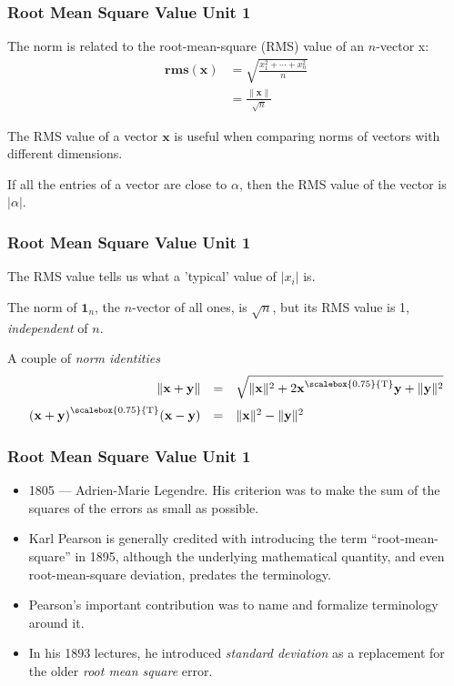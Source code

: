 \documentclass[12pt]{beamer}
\newcommand{\FrameTitle}[2]{\frametitle{#1 \hfill \small\textnormal{\textcolor{midgray}{#2}}}}
\newcommand{\vsp}{\vspace*{1em}}
\newcommand{\MVec}[1]{\mathbf{#1}}
\newcommand{\Norm}[1]{\lVert {\mathbf{#1}} \rVert}
\newcommand{\Trans}{\text{\raisebox{0.5ex}{\scalebox{0.75}{T}}}}
\newcommand{\abs}[1]{\lvert {#1} \rvert}
\begin{document}
\begin{frame}\FrameTitle{Root Mean Square Value}{Unit 1}
The norm is related to the root-mean-square (RMS) value of an $n$-vector x:
\begin{align*}
    \mathbf{rms}(\MVec{x}) &= \sqrt{\frac{x^2_1 + \cdots + x^2_n}{n}} \\[4pt]
                    &= \frac{\Norm{x}}{\sqrt{n}}
\end{align*}

The RMS value of a vector $\MVec{x}$ is useful when comparing norms of vectors
with different dimensions.

\vspace*{4pt}
If all the entries of a vector are close to $\alpha$, then the RMS
value of the vector is $\abs{\alpha}$.
\end{frame}

\begin{frame}\FrameTitle{Root Mean Square Value}{Unit 1}
{\color{blue!40}The RMS value tells us what a 'typical' value of $\abs{x_i}$ is.}

\vsp
The norm of $\MVec{1}_n$, the $n$-vector of all ones, is $\sqrt{n}$, but its RMS value is 1,
\emph{independent} of $n$.

\vsp
A couple of \emph{norm identities}
\[
    \begin{array}{rll}
    \Norm{x + y} &=& \sqrt{\Norm{x}^2 + 2 \MVec{x}^{\Trans} \MVec{y} + \Norm{y}^2}\vspace*{6pt}\\
    (\MVec{x} + \MVec{y})^\Trans (\MVec{x} - \MVec{y}) &=& \Norm{x}^2 - \Norm{y}^2
    \end{array}
\]

\end{frame}


\begin{frame}\FrameTitle{Root Mean Square Value}{Unit 1}
    \begin{itemize}
        \item[--] 1805 — Adrien-Marie Legendre. His criterion was
        to make the sum of the squares of the errors as small as possible.
        \item[--] Karl Pearson is generally credited with introducing the
        term “root-mean-square” in 1895, although the underlying
        mathematical quantity, and even root-mean-square deviation,
        predates the terminology.
        \item[--] Pearson's important contribution was to name and
        formalize terminology around it.
        \item[--] In his 1893 lectures, he introduced
        \emph{standard deviation} as a replacement for the older
        \emph{root mean square} error.
    \end{itemize}
\end{frame}
\end{document}
